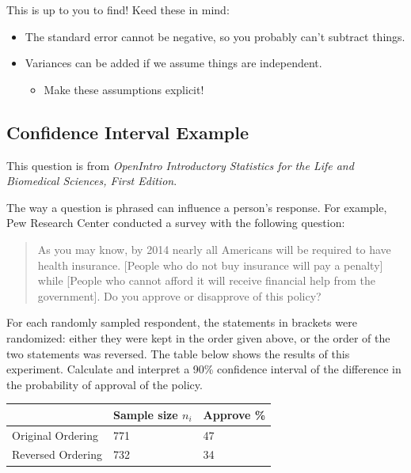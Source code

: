 \documentclass[
  letterpaper,
  DIV=11,
  numbers=noendperiod,
  oneside]{scrreprt}
\providecommand{\tightlist}{%
  \setlength{\itemsep}{0pt}\setlength{\parskip}{0pt}}\usepackage{longtable,booktabs,array}
\begin{document}
This is up to you to find! Keed these in mind:

\begin{itemize}
\tightlist
\item
  The standard error cannot be negative, so you probably can't subtract
  things.
\item
  Variances can be added if we assume things are independent.

  \begin{itemize}
  \tightlist
  \item
    Make these assumptions explicit!
  \end{itemize}
\end{itemize}

\hypertarget{confidence-interval-example-1}{%
\subsection{Confidence Interval
Example}\label{confidence-interval-example-1}}

This question is from \emph{OpenIntro Introductory Statistics for the
Life and Biomedical Sciences, First Edition}.

The way a question is phrased can inﬂuence a person's response. For
example, Pew Research Center conducted a survey with the following
question:

\begin{quote}
As you may know, by 2014 nearly all Americans will be required to have
health insurance. {[}People who do not buy insurance will pay a
penalty{]} while {[}People who cannot afford it will receive financial
help from the government{]}. Do you approve or disapprove of this
policy?
\end{quote}

For each randomly sampled respondent, the statements in brackets were
randomized: either they were kept in the order given above, or the order
of the two statements was reversed. The table below shows the results of
this experiment. Calculate and interpret a 90\% conﬁdence interval of
the difference in the probability of approval of the policy.

\begin{longtable}[]{@{}lll@{}}
\toprule\noalign{}
& Sample size \(n_i\) & Approve \% \\
\midrule\noalign{}
\endhead
\bottomrule\noalign{}
\endlastfoot
Original Ordering & 771 & 47 \\
Reversed Ordering & 732 & 34 \\
\end{longtable}
\end{document}
